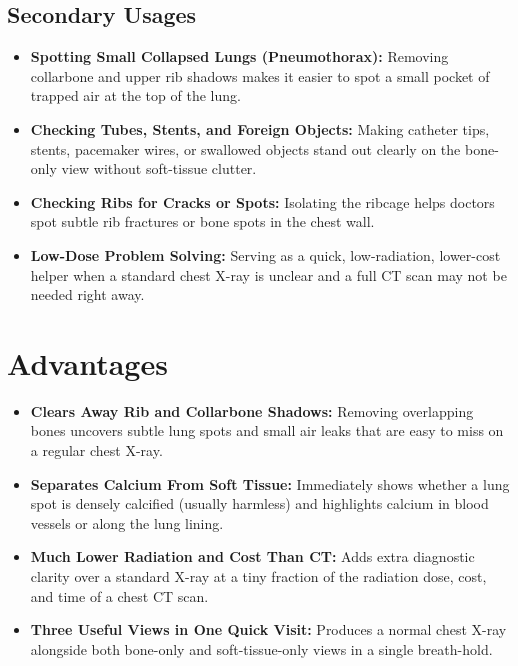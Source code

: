 \subsection{Secondary Usages}
\begin{itemize}
    \item \textbf{Spotting Small Collapsed Lungs (Pneumothorax):} Removing collarbone and upper rib shadows makes it easier to spot a small pocket of trapped air at the top of the lung.
    \item \textbf{Checking Tubes, Stents, and Foreign Objects:} Making catheter tips, stents, pacemaker wires, or swallowed objects stand out clearly on the bone-only view without soft-tissue clutter.
    \item \textbf{Checking Ribs for Cracks or Spots:} Isolating the ribcage helps doctors spot subtle rib fractures or bone spots in the chest wall.
    \item \textbf{Low-Dose Problem Solving:} Serving as a quick, low-radiation, lower-cost helper when a standard chest X-ray is unclear and a full CT scan may not be needed right away.
\end{itemize}

\section{Advantages}
\begin{itemize}
    \item \textbf{Clears Away Rib and Collarbone Shadows:} Removing overlapping bones uncovers subtle lung spots and small air leaks that are easy to miss on a regular chest X-ray.
    \item \textbf{Separates Calcium From Soft Tissue:} Immediately shows whether a lung spot is densely calcified (usually harmless) and highlights calcium in blood vessels or along the lung lining.
    \item \textbf{Much Lower Radiation and Cost Than CT:} Adds extra diagnostic clarity over a standard X-ray at a tiny fraction of the radiation dose, cost, and time of a chest CT scan.
    \item \textbf{Three Useful Views in One Quick Visit:} Produces a normal chest X-ray alongside both bone-only and soft-tissue-only views in a single breath-hold.
\end{itemize}


